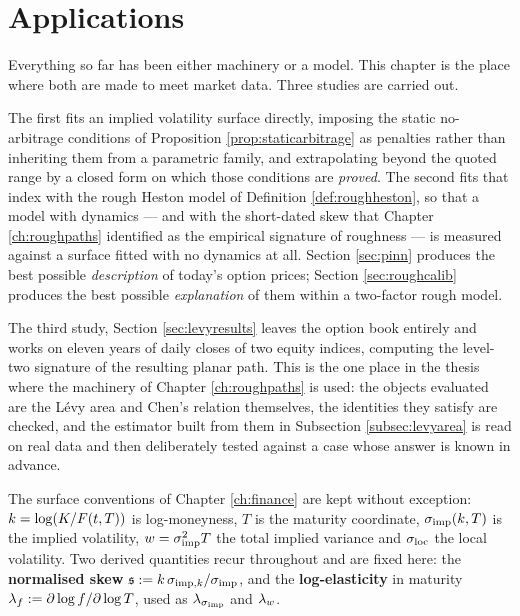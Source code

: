 \chapter{Applications} \label{ch:applications}

Everything so far has been either machinery or a model. This chapter is the place where both are
made to meet market data. Three studies are carried out. 


The first fits an implied volatility surface directly, imposing the static no-arbitrage conditions of
Proposition \ref{prop:staticarbitrage} as penalties rather than inheriting them from a parametric
family, and extrapolating beyond the quoted range by a closed form on which those conditions are
\emph{proved}. The second fits that index with the rough Heston model of
Definition \ref{def:roughheston}, so that a model with dynamics --- and with the short-dated skew
that Chapter \ref{ch:roughpaths} identified as the empirical signature of roughness --- is measured
against a surface fitted with no dynamics at all. Section \ref{sec:pinn} produces the best possible \emph{description} of
today's option prices; Section \ref{sec:roughcalib} produces the best possible \emph{explanation} of
them within a two-factor rough model. 

The third study, Section \ref{sec:levyresults} leaves
the option book entirely and works on eleven years of daily closes of two equity indices, computing
the level-two signature of the resulting planar path. This is the one place in the thesis where the
machinery of Chapter \ref{ch:roughpaths} is used: the objects
evaluated are the L\'evy area and Chen's relation themselves, the identities they satisfy are checked, and the estimator built from them in Subsection \ref{subsec:levyarea} is read on real
data and then deliberately tested against a case whose answer is known in advance.

\begin{notationbox}\label{not:applications}
The surface conventions of Chapter \ref{ch:finance} are kept without exception: $k =
\log(K/F(t,T))$ is log-moneyness, $T$ is the maturity coordinate, $\sigma_{\mathrm{imp}}(k,T)$ is the
implied volatility, $w = \sigma_{\mathrm{imp}}^{2}T$ the total implied variance and $\sigma_{\mathrm{loc}}$ the local
volatility. Two derived quantities recur throughout and are fixed here: the \textbf{normalised
skew} $\mathfrak{s} := k\,\sigma_{\mathrm{imp},k}/\sigma_{\mathrm{imp}}$, and the \textbf{log-elasticity} in maturity
$\lambda_{f} := \partial\log f/\partial\log T$, used as $\lambda_{\sigma_{\mathrm{imp}}}$ and $\lambda_{w}$.
\end{notationbox}

